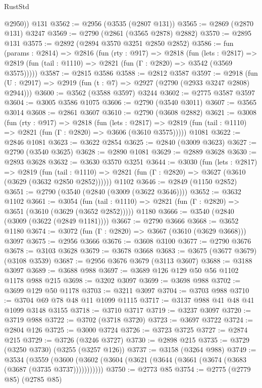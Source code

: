 \begin{lexlean}{RustStd}
\begin{coremodule}
{\begin{coremodule}
{{{{{{{{{{{{{{{{{{{{{{{{{{        @2950))
    @131
@3562 := @2956 (@3535 (@2807 @131))
@3565 := @2869 (@2870 @131) @3247
@3569 := @2790 (@2861 (@3565 @2878) @2882)
@3570 := @2895 @131
@3575 := @2892 (@2894 @3570 @3251 @2850 @2852)
@3586 := fun (params : @2814) =>
  @2816
    (fun (rty : @917) =>
    @2818
      (fun (lets : @2817) =>
      @2819 (fun (tail : @1110) => @2821 (fun (Γ : @2820) => @3542 (@3569 @3575)))))
@3587 := @2815 @3586
@3588 := @2812 @3587
@3597 := @2918 (fun (U : @2917) => @2919 (fun (t : @7) => @2927 (@2790 (@2933 @3247 @2808) @2944)))
@3600 := @3562 (@3588 @3597) @3244
@3602 := @2775 @3587 @3597
@3604 := @3005 @3586 @1075
@3606 := @2790 (@3540 @3011)
@3607 := @3565 @3014
@3608 := @2861 @3607
@3610 := @2790 (@3608 @2882)
@3621 := @3008
    (fun (rty : @917) =>
    @2818
      (fun (lets : @2817) =>
      @2819 (fun (tail : @1110) => @2821 (fun (Γ : @2820) => @3606 (@3610 @3575)))))
    @1081
@3622 := @2846 @1081
@3623 := @3622 @2854
@3625 := @2840 (@3009 @3623)
@3627 := @2790 (@3540 @3625)
@3628 := @2890 @1081
@3629 := @2889 @3628
@3630 := @2893 @3628
@3632 := @3630 @3570 @3251
@3644 := @3030
    (fun (lets : @2817) =>
    @2819
      (fun (tail : @1110) => @2821 (fun (Γ : @2820) => @3627 (@3610 (@3629 (@3632 @2850 @2852))))))
    @1102
@3646 := @2849 (@1150 @2852)
@3651 := @2790 (@3540 (@2840 (@3009 (@3622 @3646))))
@3652 := @3632 @1102
@3661 := @3054
    (fun (tail : @1110) => @2821 (fun (Γ : @2820) => @3651 (@3610 (@3629 (@3652 @2852)))))
    @1180
@3666 := @3540 (@2840 (@3009 (@3622 (@2849 @1181))))
@3667 := @2790 @3666
@3668 := @3652 @1180
@3674 := @3072 (fun (Γ : @2820) => @3667 (@3610 (@3629 @3668))) @3097
@3675 := @2956 @3666
@3676 := @3608 @3100
@3677 := @2790 @3676
@3678 := @3103 @3628
@3679 := @3678 @3668
@3683 := @3675 (@3677 @3679) (@3108 @3539)
@3687 := @2956 @3676 @3679 (@3113 @3607)
@3688 := @3188 @3097
@3689 := @3688 @988
@3697 := @3689 @126 @129 @50 @56 @1102 @1178 @988 @215
@3698 := @3202 @3097
@3699 := @3698 @988
@3702 := @3699 @129 @50 @1178
@3703 := @3211 @3097
@3704 := @3703 @988
@3710 := @3704 @69 @78 @48 @11 @1099 @1115
@3717 := @3137 @988 @41 @48 @41 @1099 @3148 @3155
@3718 := @3710 @3717
@3719 := @3237 @3097
@3720 := @3719 @988
@3722 := @3702 (@3718 @3720)
@3723 := @3697 @3722
@3724 := @2804 @126
@3725 := @3000 @3724
@3726 := @3723 @3725
@3727 := @2874 @215
@3729 := @3726 (@3246 @3727)
@3730 := @2898 @215
@3735 := @3729 (@3250 @3730) (@3255 (@3257 @126))
@3737 := @3158 (@3264 @988)
@3749 := @3534
    (@3559 (@3600 (@3602 (@3604 (@3621 (@3644 (@3661 (@3674 (@3683 (@3687 (@3735 @3737)))))))))))
@3750 := @2773 @85
@3754 := @2775 (@2779 @85) (@2785 @85)
}}}}}}}}}}}}}}}}}}}}}}}}}}
\end{coremodule}}
\end{coremodule}
\end{lexlean}
